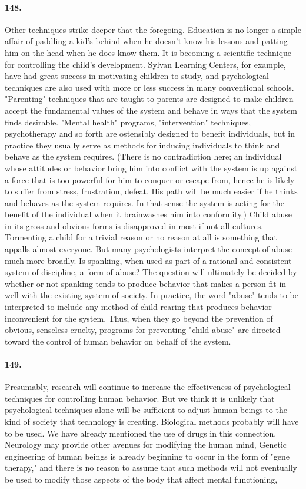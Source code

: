 \documentclass[12pt]{book}
\begin{document}
\paragraph{148.} Other techniques strike deeper that the foregoing. Education is no longer a simple affair of paddling a kid's behind when he doesn't know his lessons and patting him on the head when he does know them. It is becoming a scientific technique for controlling the child's development.  Sylvan Learning Centers, for example, have had great success in motivating children to study, and psychological techniques are also used with more or less success in many conventional schools. "Parenting" techniques that are taught to parents are designed to make children accept the fundamental values of the system and behave in ways that the system finds desirable.  "Mental health" programs, "intervention" techniques, psychotherapy and so forth are ostensibly designed to benefit individuals, but in practice they usually serve as methods for inducing individuals to think and behave as the system requires. (There is no contradiction here; an individual whose attitudes or behavior bring him into conflict with the system is up against a force that is too powerful for him to conquer or escape from, hence he is likely to suffer from stress, frustration, defeat. His path will be much easier if he thinks and behaves as the system requires. In that sense the system is acting for the benefit of the individual when it brainwashes him into conformity.) Child abuse in its gross and obvious forms is disapproved in most if not all cultures. Tormenting a child for a trivial reason or no reason at all is something that appalls almost everyone. But many psychologists interpret the concept of abuse much more broadly. Is spanking, when used as part of a rational and consistent system of discipline, a form of abuse?  The question will ultimately be decided by whether or not spanking tends to produce behavior that makes a person fit in well with the existing system of society. In practice, the word "abuse" tends to be interpreted to include any method of child-rearing that produces behavior inconvenient for the system.  Thus, when they go beyond the prevention of obvious, senseless cruelty, programs for preventing "child abuse" are directed toward the control of human behavior on behalf of the system.


\paragraph{149.} Presumably, research will continue to increase the effectiveness of psychological techniques for controlling human behavior. But we think it is unlikely that psychological techniques alone will be sufficient to adjust human beings to the kind of society that technology is creating. Biological methods probably will have to be used. We have already mentioned the use of drugs in this connection. Neurology may provide other avenues for modifying the human mind, Genetic engineering of human beings is already beginning to occur in the form of "gene therapy," and there is no reason to assume that such methods will not eventually be used to modify those aspects of the body that affect mental functioning,
\end{document}
